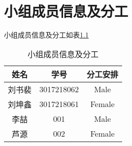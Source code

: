 \chapter{小组成员信息及分工}

小组成员信息及分工如表\ref{table::stuinfo1}

\begin{table}[htbp]
\centering
\caption{小组成员信息及分工}
\label{table::stuinfo1}
\begin{tabular}{ccc}
\toprule
姓名& 学号& 分工安排\\
\midrule
刘书裴& 3017218062& Male\\
刘坤鑫& 3017218061& Female\\
李喆  & 001& Male\\
芦源  & 002& Female\\
\bottomrule
\end{tabular}
\end{table}
